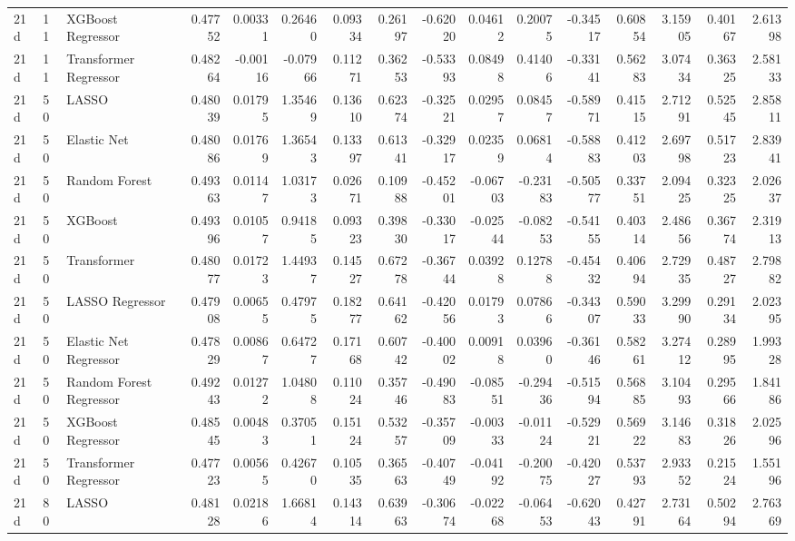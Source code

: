\begin{tabular}{lllrrrrrrrrrrrrr}
21d & 11 & XGBoost Regressor & 0.47752 & 0.00331 & 0.26460 & 0.09334 & 0.26197 & -0.62020 & 0.04612 & 0.20075 & -0.34517 & 0.60854 & 3.15905 & 0.40167 & 2.61398 \\
21d & 11 & Transformer Regressor & 0.48264 & -0.00116 & -0.07966 & 0.11271 & 0.36253 & -0.53393 & 0.08498 & 0.41406 & -0.33141 & 0.56283 & 3.07434 & 0.36325 & 2.58133 \\
21d & 50 & LASSO & 0.48039 & 0.01795 & 1.35469 & 0.13610 & 0.62374 & -0.32521 & 0.02957 & 0.08457 & -0.58971 & 0.41515 & 2.71291 & 0.52545 & 2.85811 \\
21d & 50 & Elastic Net & 0.48086 & 0.01769 & 1.36543 & 0.13397 & 0.61341 & -0.32917 & 0.02359 & 0.06814 & -0.58883 & 0.41203 & 2.69798 & 0.51723 & 2.83941 \\
21d & 50 & Random Forest & 0.49363 & 0.01147 & 1.03173 & 0.02671 & 0.10988 & -0.45201 & -0.06703 & -0.23183 & -0.50577 & 0.33751 & 2.09425 & 0.32325 & 2.02637 \\
21d & 50 & XGBoost & 0.49396 & 0.01057 & 0.94185 & 0.09323 & 0.39830 & -0.33017 & -0.02544 & -0.08253 & -0.54155 & 0.40314 & 2.48656 & 0.36774 & 2.31913 \\
21d & 50 & Transformer & 0.48077 & 0.01723 & 1.44937 & 0.14527 & 0.67278 & -0.36744 & 0.03928 & 0.12788 & -0.45432 & 0.40694 & 2.72935 & 0.48727 & 2.79882 \\
21d & 50 & LASSO Regressor & 0.47908 & 0.00655 & 0.47975 & 0.18277 & 0.64162 & -0.42056 & 0.01793 & 0.07866 & -0.34307 & 0.59033 & 3.29990 & 0.29134 & 2.02395 \\
21d & 50 & Elastic Net Regressor & 0.47829 & 0.00867 & 0.64727 & 0.17168 & 0.60742 & -0.40002 & 0.00918 & 0.03960 & -0.36146 & 0.58261 & 3.27412 & 0.28995 & 1.99328 \\
21d & 50 & Random Forest Regressor & 0.49243 & 0.01272 & 1.04808 & 0.11024 & 0.35746 & -0.49083 & -0.08551 & -0.29436 & -0.51594 & 0.56885 & 3.10493 & 0.29566 & 1.84186 \\
21d & 50 & XGBoost Regressor & 0.48545 & 0.00483 & 0.37051 & 0.15124 & 0.53257 & -0.35709 & -0.00333 & -0.01124 & -0.52921 & 0.56922 & 3.14683 & 0.31826 & 2.02596 \\
21d & 50 & Transformer Regressor & 0.47723 & 0.00565 & 0.42670 & 0.10535 & 0.36563 & -0.40749 & -0.04192 & -0.20075 & -0.42027 & 0.53793 & 2.93352 & 0.21524 & 1.55196 \\
21d & 80 & LASSO & 0.48128 & 0.02186 & 1.66814 & 0.14314 & 0.63963 & -0.30674 & -0.02268 & -0.06453 & -0.62043 & 0.42791 & 2.73164 & 0.50294 & 2.76369 \\

\end{tabular}
